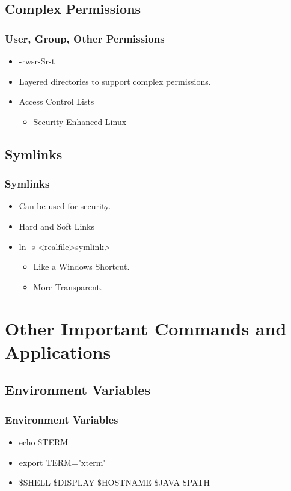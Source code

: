 \documentclass[hyperref={pdfpagelabels=false}]{beamer}
\begin{document}
\subsection{Complex Permissions}
\frame
{
    \frametitle{User, Group, Other Permissions}
    \begin{itemize}
    \item{-\hspace{.1 pc}r\hspace{.1 pc}w\hspace{.1 pc}s\hspace{.1 pc}r\hspace{.1 pc}-\hspace{.1 pc}S\hspace{.1 pc}r\hspace{.1 pc}-\hspace{.1 pc}t}
    \item{Layered directories to support complex permissions.}
    \item{Access Control Lists}
        \begin{itemize}
        \item{Security Enhanced Linux}
        \end{itemize}
    \end{itemize}
}
\subsection{Symlinks}
\frame
{
    \frametitle{Symlinks}
    \begin{itemize}
    \item{Can be used for security.}
    \item{Hard and Soft Links}
    \item{ln -s {\textless}realfile\textgreater\hspace{.5 pc}{\textless}symlink\textgreater\hspace{.5 pc}}
        \begin{itemize}
        \item{Like a Windows Shortcut.}
        \item{More Transparent.}
        \end{itemize}
    \end{itemize}
}
\section{Other Important Commands and Applications}
\subsection{Environment Variables}
\frame
{
    \frametitle{Environment Variables}
    \begin{itemize}
    \item{echo \$TERM}
    \item{export TERM="xterm"}
    \item{\$SHELL \$DISPLAY \$HOSTNAME \$JAVA \$PATH}
    \end{itemize}
}
\end{document}
